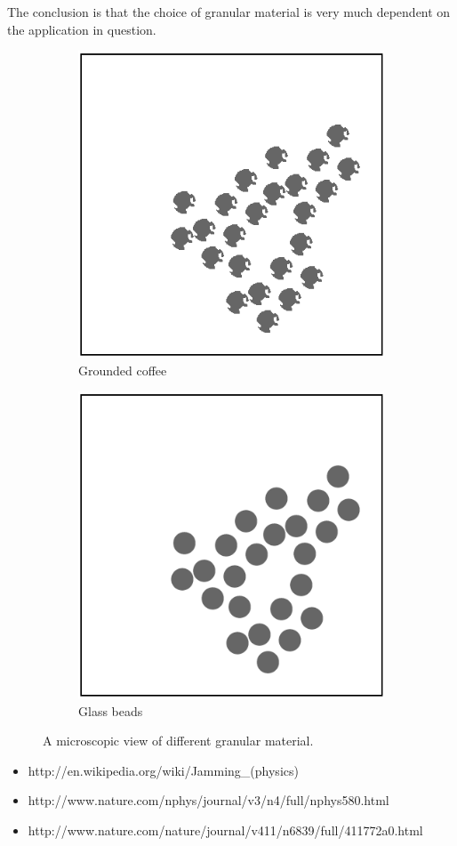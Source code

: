 The conclusion is that the choice of granular material is very much dependent on the application in question. 

\begin{figure}
\centering
\begin{subfigure}{.5\textwidth}
  \centering
  \includegraphics[width=.4\linewidth]{figures/jamming/coffee-grains}
  \caption{Grounded coffee}
  \label{fig:sub1}
\end{subfigure}%
\begin{subfigure}{.5\textwidth}
  \centering
  \includegraphics[width=.4\linewidth]{figures/jamming/glass-beads}
  \caption{Glass beads}
  \label{fig:sub2}
\end{subfigure}
\caption{A microscopic view of different granular material.}
\label{fig:ch:jamming:particles-close-up}
\end{figure}


\begin{itemize}
	\item http://en.wikipedia.org/wiki/Jamming\_(physics)
	\item http://www.nature.com/nphys/journal/v3/n4/full/nphys580.html
	\item http://www.nature.com/nature/journal/v411/n6839/full/411772a0.html
\end{itemize}

